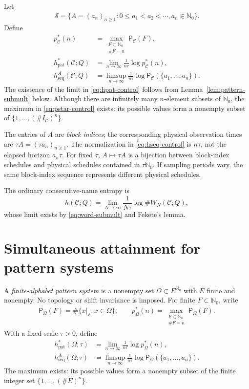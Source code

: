 \documentclass[11pt,reqno]{amsart}
\numberwithin{equation}{section}
\theoremstyle{definition}
\newcommand{\Nzero}{\mathbb N_0}
\newcommand{\C}{\mathcal C}
\newcommand{\Patt}{\mathsf P}
\newcommand{\hseq}{h_{\mathrm{seq}}}
\newcommand{\hpat}{h_{\mathrm{pat}}^{*}}
\begin{document}
Let
\begin{align*}
 \mathscr S=\{A=(a_n)_{n\ge1}:0\le a_1<a_2<\cdots, a_n\in\Nzero\}.
\end{align*}
Define
\begin{align}
 p_\C^*(n)&=\max_{\substack{F\subset\Nzero\\\#F=n}}\Patt_\C(F),
 \label{eq:pstar-control}\\
 \hpat(\C;Q)&=\lim_{n\to\infty}\frac1{n\tau}\log p_\C^*(n),
 \label{eq:hpat-control}\\
 \hseq^A(\C;Q)&=\limsup_{n\to\infty}\frac1{n\tau}
 \log\Patt_\C(\{a_1,\ldots,a_n\}).
 \label{eq:hseq-control}
\end{align}
The existence of the limit in \eqref{eq:hpat-control} follows from
Lemma~\ref{lem:pattern-submult} below.  Although there are infinitely many
$n$-element subsets of $\Nzero$, the maximum in \eqref{eq:pstar-control}
exists: its possible values form a nonempty subset of
$\{1,\ldots,(\#I_\C)^n\}$.

The entries of $A$ are \emph{block indices}; the corresponding physical
observation times are $\tau A=(\tau a_n)_{n\ge1}$.  The normalization in
\eqref{eq:hseq-control} is $n\tau$, not the elapsed horizon $a_n\tau$.
For fixed $\tau$, $A\mapsto\tau A$ is a bijection between block-index
schedules and physical schedules contained in $\tau\Nzero$.  If sampling
periods vary, the same block-index sequence represents different physical
schedules.

The ordinary consecutive-name entropy is
\begin{equation}\label{eq:ordinary-partition-entropy}
 h(\C;Q)=\lim_{N\to\infty}\frac1{N\tau}\log\#W_N(\C;Q),
\end{equation}
whose limit exists by \eqref{eq:word-submult} and Fekete's lemma.

\section{Simultaneous attainment for pattern systems}\label{sec:comb}

A \emph{finite-alphabet pattern system} is a nonempty set
$\Omega\subset E^{\Nzero}$ with $E$ finite and nonempty.  No topology or
shift invariance is imposed.  For finite $F\subset\Nzero$, write
\begin{align*}
 \Patt_\Omega(F)=\#\{x|_F:x\in\Omega\},
 \qquad
 p_\Omega^*(n)=
 \max_{\substack{F\subset\Nzero\\\#F=n}}\Patt_\Omega(F).
\end{align*}
With a fixed scale $\tau>0$, define
\begin{align*}
 \hpat(\Omega;\tau)&=\lim_{n\to\infty}
       \frac1{n\tau}\log p_\Omega^*(n),\\
 \hseq^A(\Omega;\tau)&=\limsup_{n\to\infty}
       \frac1{n\tau}\log
       \Patt_\Omega(\{a_1,\ldots,a_n\}).
\end{align*}
The maximum exists: its possible values form a nonempty subset of the finite
integer set $\{1,\ldots,(\#E)^n\}$.
\end{document}
